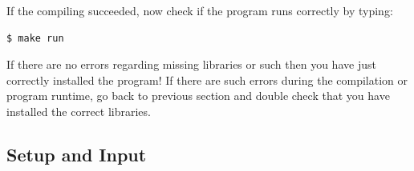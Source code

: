 \documentclass[english,12pt,a4paper,pdftex,sci,utf8]{aaltothesis}
\begin{document}

\noindent If the compiling succeeded, now check if the program runs correctly by typing:
\begin{verbatim}
$ make run
\end{verbatim}
If there are no errors regarding missing libraries or such then you have just correctly installed the program! If there are such errors during the compilation or program runtime, go back to previous section and double check that you have installed the correct libraries. 

\subsection{Setup and Input}
\end{document}
